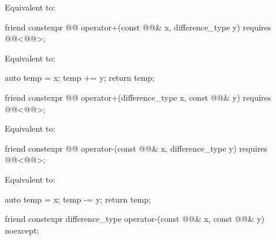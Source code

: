 \begin{itemdescr}
\pnum
\effects
Equivalent to: 
\end{itemdescr}

%
\begin{itemdecl}
friend constexpr @@ operator+(const @@& x, difference_type y)
  requires @@<@@>;
\end{itemdecl}

\begin{itemdescr}
\pnum
\effects
Equivalent to:
\begin{codeblock}
auto temp = x;
temp += y;
return temp;
\end{codeblock}
\end{itemdescr}

%
\begin{itemdecl}
friend constexpr @@ operator+(difference_type x, const @@& y)
  requires @@<@@>;
\end{itemdecl}

\begin{itemdescr}
\pnum
\effects
Equivalent to: 
\end{itemdescr}

%
\begin{itemdecl}
friend constexpr @@ operator-(const @@& x, difference_type y)
  requires @@<@@>;
\end{itemdecl}

\begin{itemdescr}
\pnum
\effects
Equivalent to:
\begin{codeblock}
auto temp = x;
temp -= y;
return temp;
\end{codeblock}
\end{itemdescr}

%
\begin{itemdecl}
friend constexpr difference_type operator-(const @@& x, const @@& y) noexcept;
\end{itemdecl}

